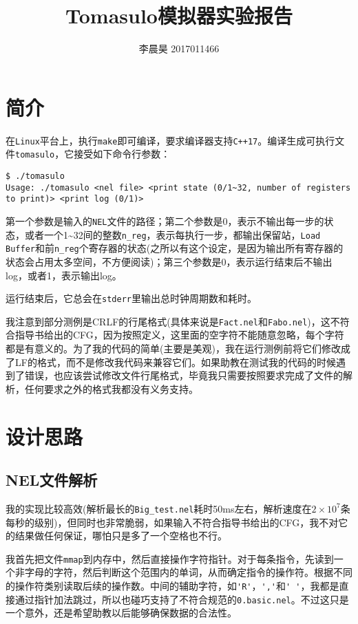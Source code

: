 \documentclass[12pt, UTF8]{article}
\title{Tomasulo模拟器实验报告}
\author{李晨昊 2017011466}
\begin{document}
\maketitle
\tableofcontents

\section{简介}

在\lstinline|Linux|平台上，执行\lstinline|make|即可编译，要求编译器支持\lstinline|C++17|。编译生成可执行文件\lstinline|tomasulo|，它接受如下命令行参数：

\begin{lstlisting}
$ ./tomasulo                     
Usage: ./tomasulo <nel file> <print state (0/1~32, number of registers to print)> <print log (0/1)>
\end{lstlisting}

第一个参数是输入的\lstinline|NEL|文件的路径；第二个参数是0，表示不输出每一步的状态，或者一个1\textasciitilde 32间的整数\lstinline|n_reg|，表示每执行一步，都输出保留站，\lstinline|Load Buffer|和前\lstinline|n_reg|个寄存器的状态(之所以有这个设定，是因为输出所有寄存器的状态会占用太多空间，不方便阅读)；第三个参数是0，表示运行结束后不输出log，或者1，表示输出log。

运行结束后，它总会在\lstinline|stderr|里输出总时钟周期数和耗时。

我注意到部分测例是CRLF的行尾格式(具体来说是\lstinline|Fact.nel|和\lstinline|Fabo.nel|)，这不符合指导书给出的CFG，因为按照定义，这里面的空字符不能随意忽略，每个字符都是有意义的。为了我的代码的简单(主要是美观)，我在运行测例前将它们修改成了LF的格式，而不是修改我代码来兼容它们。如果助教在测试我的代码的时候遇到了错误，也应该尝试修改文件行尾格式，毕竟我只需要按照要求完成了文件的解析，任何要求之外的格式我都没有义务支持。

\section{设计思路}

\subsection{NEL文件解析}

我的实现比较高效(解析最长的\lstinline|Big_test.nel|耗时50ms左右，解析速度在$2 \times 10^7$条每秒的级别)，但同时也非常脆弱，如果输入不符合指导书给出的CFG，我不对它的结果做任何保证，哪怕只是多了一个空格也不行。

我首先把文件\lstinline|mmap|到内存中，然后直接操作字符指针。对于每条指令，先读到一个非字母的字符，然后判断这个范围内的单词，从而确定指令的操作符。根据不同的操作符类别读取后续的操作数。中间的辅助字符，如\lstinline|'R'|，\lstinline|','|和\lstinline|' '|，我都是直接通过指针加法跳过，所以也碰巧支持了不符合规范的\lstinline|0.basic.nel|。不过这只是一个意外，还是希望助教以后能够确保数据的合法性。
\end{document}
